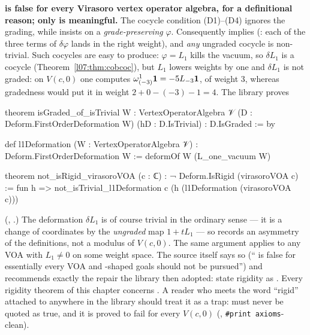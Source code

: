 \begin{warning}\label{l07:warn:isrigid}
\textbf{ is false for every Virasoro vertex operator algebra, for a definitional
reason; only  is meaningful.} The cocycle condition (D1)--(D4) ignores the
grading, while  insists on a \emph{grade-preserving} $\varphi$. Consequently
 implies  (: each of the
three terms of $\delta\varphi$ lands in the right weight), and \emph{any} ungraded cocycle is
non-trivial. Such cocycles are easy to produce: $\varphi = L_1$ kills the vacuum, so
$\delta L_1$ is a cocycle (Theorem~\ref{l07:thm:cobcoc}), but $L_1$ lowers weights by one and
$\delta L_1$ is not graded: on $V(c,0)$ one computes $\omega^1_{(-3)}\mathbf{1} = -5L_{-3}\mathbf{1}$,
of weight $3$, whereas gradedness would put it in weight $2+0-(-3)-1 = 4$. The library proves
\begin{leancode}
theorem isGraded_of_isTrivial {W : VertexOperatorAlgebra 𝒱}
    (D : Deform.FirstOrderDeformation W) (hD : D.IsTrivial) : D.IsGraded := by

def l1Deformation (W : VertexOperatorAlgebra 𝒱) : Deform.FirstOrderDeformation W :=
  deformOf W (L_one_vacuum W)

theorem not_isRigid_virasoroVOA (c : ℂ) : ¬ Deform.IsRigid (virasoroVOA c) :=
  fun h => not_isTrivial_l1Deformation c (h (l1Deformation (virasoroVOA c)))
\end{leancode}
(, .) The deformation
$\delta L_1$ is of course trivial in the ordinary sense --- it is a change of coordinates by the
\emph{ungraded} map $1+tL_1$ --- so  records an asymmetry of the
definitions, not a modulus of $V(c,0)$. The same argument applies to any VOA with $L_1\ne0$ on
some weight space. The source itself says so (`` is false for essentially every
VOA and -shaped goals should not be pursued'') and recommends exactly the repair the
library then adopted: state rigidity as . Every rigidity theorem of this chapter
concerns . A reader who meets the word ``rigid'' attached to 
anywhere in the library should treat it as a trap:  must never be quoted as true, and
it is proved to fail for every $V(c,0)$
(, \texttt{\#print axioms}-clean).
\end{warning}

